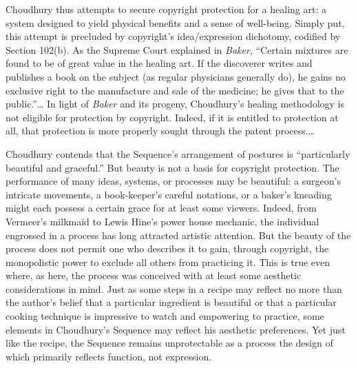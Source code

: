Choudhury thus attempts to secure copyright protection for a healing
art: a system designed to yield physical benefits and a sense of
well-being. Simply put, this attempt is precluded by copyright's
idea/expression dichotomy, codified by Section 102(b).
As the Supreme
Court explained in \textit{Baker}, ``Certain mixtures are found to be of
great value in the healing art. If the discoverer writes and publishes a
book on the subject (as regular physicians generally do), he gains no
exclusive right to the manufacture and sale of the medicine; he gives
that to the public.''\ldots
In light of \textit{Baker} and its progeny, Choudhury's healing methodology
is not eligible for protection by copyright. Indeed, if it is entitled
to protection at all, that protection is more properly sought through
the patent process.\ldots


Choudhury contends that the Sequence's arrangement of postures is
``particularly beautiful and graceful.'' But beauty is not a basis for
copyright protection. The performance of many ideas, systems, or
processes may be beautiful: a surgeon's intricate movements, a
book-keeper's careful notations, or a baker's kneading might each
possess a certain grace for at least some viewers. Indeed, from
Vermeer's milkmaid to Lewis Hine's power house mechanic, the individual
engrossed in a process has long attracted artistic attention. But the
beauty of the process does not permit one who describes it to gain,
through copyright, the monopolistic power to exclude all others from
practicing it. This is true even where, as here, the process was
conceived with at least some aesthetic considerations in mind. Just as
some steps in a recipe may reflect no more than the author's belief that
a particular ingredient is beautiful or that a particular cooking
technique is impressive to watch and empowering to practice, some
elements in Choudhury's Sequence may reflect his aesthetic preferences.
Yet just like the recipe, the Sequence remains unprotectable as a
process the design of which primarily reflects function, not expression.

